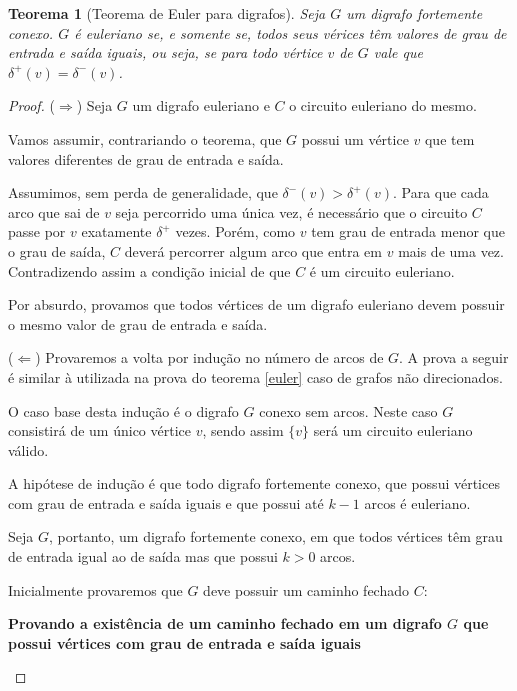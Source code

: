 \documentclass[12pt, a4paper]{article}
\newtheorem{theorem}{Teorema}[section]
\begin{document}
\begin{theorem}[Teorema de Euler para digrafos]

    Seja $G$ um digrafo fortemente conexo.
$G$ é euleriano se, e somente se, todos seus vérices têm valores de grau de entrada e saída iguais, ou seja, se para todo vértice $v$ de $G$ vale que $\delta^+(v) = \delta^-(v)$.
\label{euler-digraph}
\end{theorem}


\begin{proof}

    ($\Rightarrow$) Seja $G$ um digrafo euleriano e $C$ o circuito euleriano do mesmo. 

    Vamos assumir, contrariando o teorema, que $G$ possui um vértice $v$ que tem valores diferentes de grau de entrada e saída.

    Assumimos, sem perda de generalidade, que $\delta^-(v) > \delta^+(v)$. 
    Para que cada arco que sai de $v$ seja percorrido uma única vez, é necessário que o circuito $C$ passe por $v$ exatamente $\delta^+$ vezes. 
    Porém, como $v$ tem grau de entrada menor que o grau de saída, $C$ deverá percorrer algum arco que entra em $v$ mais de uma vez. 
    Contradizendo assim a condição inicial de que $C$ é um circuito euleriano.

    Por absurdo, provamos que todos vértices de um digrafo euleriano devem possuir o mesmo valor de grau de entrada e saída.

    ($\Leftarrow$) Provaremos a volta por indução no número de arcos de $G$. 
    A prova a seguir é similar à utilizada na prova do teorema \ref{euler} caso de grafos não direcionados.

    O caso base desta indução é o digrafo $G$ conexo sem arcos. Neste caso $G$ consistirá de um único vértice $v$, sendo assim $\{v\}$ será um circuito euleriano válido. 

    A hipótese de indução é que todo digrafo fortemente conexo, que possui vértices com grau de entrada e saída iguais e que possui até $k-1$ arcos é euleriano.

    Seja $G$, portanto, um digrafo fortemente conexo, em que todos vértices têm grau de entrada igual ao de saída mas que possui $k > 0$ arcos.

    Inicialmente provaremos que $G$ deve possuir um caminho fechado $C$:

    \begin{tcolorbox}
        \textbf{Provando a existência de um caminho fechado em um digrafo $G$ que possui vértices com grau de entrada e saída iguais}


\end{tcolorbox}
\end{proof}
\end{document}
